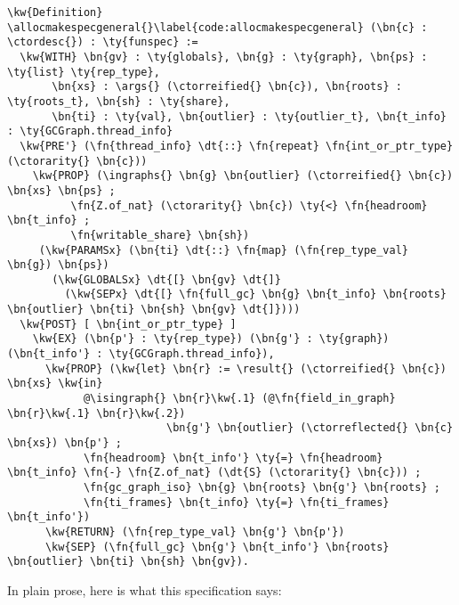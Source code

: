 \newcommand{\allocmakespecgeneral}{\hyperref[code:allocmakespecgeneral]{\fn{alloc\_\linebreak[0]make\_\linebreak[0]spec\_\linebreak[0]general}}}
\begin{Verbatim}
\kw{Definition} \allocmakespecgeneral{}\label{code:allocmakespecgeneral} (\bn{c} : \ctordesc{}) : \ty{funspec} :=
  \kw{WITH} \bn{gv} : \ty{globals}, \bn{g} : \ty{graph}, \bn{ps} : \ty{list} \ty{rep_type},
       \bn{xs} : \args{} (\ctorreified{} \bn{c}), \bn{roots} : \ty{roots_t}, \bn{sh} : \ty{share},
       \bn{ti} : \ty{val}, \bn{outlier} : \ty{outlier_t}, \bn{t_info} : \ty{GCGraph.thread_info}
  \kw{PRE'} (\fn{thread_info} \dt{::} \fn{repeat} \fn{int_or_ptr_type} (\ctorarity{} \bn{c}))
    \kw{PROP} (\ingraphs{} \bn{g} \bn{outlier} (\ctorreified{} \bn{c}) \bn{xs} \bn{ps} ;
          \fn{Z.of_nat} (\ctorarity{} \bn{c}) \ty{<} \fn{headroom} \bn{t_info} ;
          \fn{writable_share} \bn{sh})
     (\kw{PARAMSx} (\bn{ti} \dt{::} \fn{map} (\fn{rep_type_val} \bn{g}) \bn{ps})
       (\kw{GLOBALSx} \dt{[} \bn{gv} \dt{]}
         (\kw{SEPx} \dt{[} \fn{full_gc} \bn{g} \bn{t_info} \bn{roots} \bn{outlier} \bn{ti} \bn{sh} \bn{gv} \dt{]})))
  \kw{POST} [ \bn{int_or_ptr_type} ]
    \kw{EX} (\bn{p'} : \ty{rep_type}) (\bn{g'} : \ty{graph}) (\bn{t_info'} : \ty{GCGraph.thread_info}),
      \kw{PROP} (\kw{let} \bn{r} := \result{} (\ctorreified{} \bn{c}) \bn{xs} \kw{in}
            @\isingraph{} \bn{r}\kw{.1} (@\fn{field_in_graph} \bn{r}\kw{.1} \bn{r}\kw{.2}) 
                         \bn{g'} \bn{outlier} (\ctorreflected{} \bn{c} \bn{xs}) \bn{p'} ;
            \fn{headroom} \bn{t_info'} \ty{=} \fn{headroom} \bn{t_info} \fn{-} \fn{Z.of_nat} (\dt{S} (\ctorarity{} \bn{c})) ;
            \fn{gc_graph_iso} \bn{g} \bn{roots} \bn{g'} \bn{roots} ;
            \fn{ti_frames} \bn{t_info} \ty{=} \fn{ti_frames} \bn{t_info'})
      \kw{RETURN} (\fn{rep_type_val} \bn{g'} \bn{p'})
      \kw{SEP} (\fn{full_gc} \bn{g'} \bn{t_info'} \bn{roots} \bn{outlier} \bn{ti} \bn{sh} \bn{gv}).
\end{Verbatim}

In plain prose, here is what this specification says:

